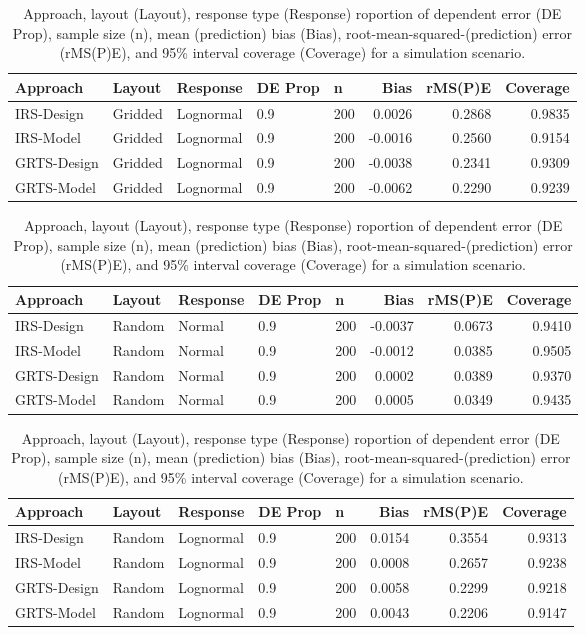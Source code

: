 \documentclass[]{elsarticle} %
\begin{document}
\begin{table}[ht]
\centering
\begin{tabular}{lllllrrr}
  \hline
Approach & Layout & Response & DE Prop & n & Bias & rMS(P)E & Coverage \\ 
  \hline
IRS-Design & Gridded & Lognormal & 0.9 & 200 & 0.0026 & 0.2868 & 0.9835 \\ 
  IRS-Model & Gridded & Lognormal & 0.9 & 200 & -0.0016 & 0.2560 & 0.9154 \\ 
  GRTS-Design & Gridded & Lognormal & 0.9 & 200 & -0.0038 & 0.2341 & 0.9309 \\ 
  GRTS-Model & Gridded & Lognormal & 0.9 & 200 & -0.0062 & 0.2290 & 0.9239 \\ 
   \hline
\end{tabular}
\caption{Approach, layout (Layout), response type (Response) roportion of dependent error (DE Prop), sample size (n), mean (prediction) bias (Bias), root-mean-squared-(prediction) error (rMS(P)E), and 95\% interval coverage (Coverage) for a simulation scenario.} 
\end{table}
\begin{table}[ht]
\centering
\begin{tabular}{lllllrrr}
  \hline
Approach & Layout & Response & DE Prop & n & Bias & rMS(P)E & Coverage \\ 
  \hline
IRS-Design & Random & Normal & 0.9 & 200 & -0.0037 & 0.0673 & 0.9410 \\ 
  IRS-Model & Random & Normal & 0.9 & 200 & -0.0012 & 0.0385 & 0.9505 \\ 
  GRTS-Design & Random & Normal & 0.9 & 200 & 0.0002 & 0.0389 & 0.9370 \\ 
  GRTS-Model & Random & Normal & 0.9 & 200 & 0.0005 & 0.0349 & 0.9435 \\ 
   \hline
\end{tabular}
\caption{Approach, layout (Layout), response type (Response) roportion of dependent error (DE Prop), sample size (n), mean (prediction) bias (Bias), root-mean-squared-(prediction) error (rMS(P)E), and 95\% interval coverage (Coverage) for a simulation scenario.} 
\end{table}
\begin{table}[ht]
\centering
\begin{tabular}{lllllrrr}
  \hline
Approach & Layout & Response & DE Prop & n & Bias & rMS(P)E & Coverage \\ 
  \hline
IRS-Design & Random & Lognormal & 0.9 & 200 & 0.0154 & 0.3554 & 0.9313 \\ 
  IRS-Model & Random & Lognormal & 0.9 & 200 & 0.0008 & 0.2657 & 0.9238 \\ 
  GRTS-Design & Random & Lognormal & 0.9 & 200 & 0.0058 & 0.2299 & 0.9218 \\ 
  GRTS-Model & Random & Lognormal & 0.9 & 200 & 0.0043 & 0.2206 & 0.9147 \\ 
   \hline
\end{tabular}
\caption{Approach, layout (Layout), response type (Response) roportion of dependent error (DE Prop), sample size (n), mean (prediction) bias (Bias), root-mean-squared-(prediction) error (rMS(P)E), and 95\% interval coverage (Coverage) for a simulation scenario.} 
\end{table}
\end{document}
